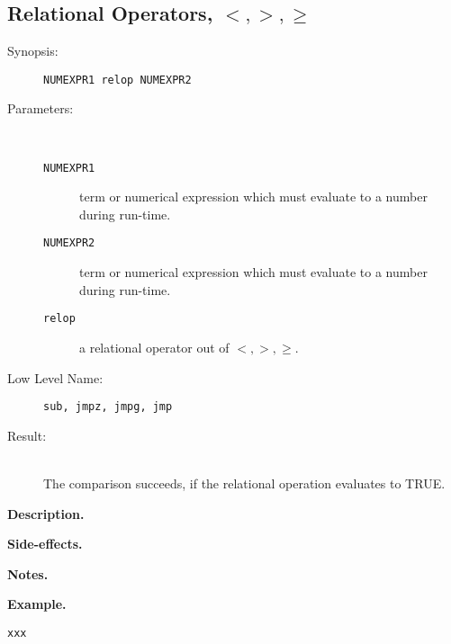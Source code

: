 %
%
%
\subsection{Relational Operators, $<,>,\geq$}

\begin{description}
\item[Synopsis:]
	{\tt NUMEXPR1 relop NUMEXPR2}
\item[Parameters:]\ \\[-0.5cm]
	\begin{description}
	\item[{\tt NUMEXPR1}]
term or numerical expression which must evaluate to a number during
run-time.
	\item[{\tt NUMEXPR2}]
term or numerical expression which must evaluate to a number during
run-time.
	\item[{\tt relop}]
a relational operator out of $<,>,\geq$.
	\end{description}
\item[Low Level Name:]
	{\tt sub, jmpz, jmpg, jmp}
\item[Result:]\ \\
The comparison succeeds, if the relational operation evaluates to TRUE.
\end{description}

\vspace*{0.5cm}
\noindent
{\bf Description.}

\vspace*{0.5cm}
\noindent
{\bf Side-effects.}

\vspace*{0.5cm}
\noindent
{\bf Notes.}

\vspace*{0.5cm}
\noindent
{\bf Example.}
\begin{verbatim}
xxx
\end{verbatim}


